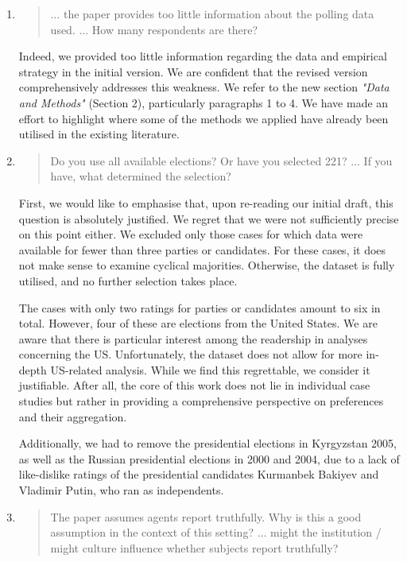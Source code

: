 \documentclass[a4paper, 12pt]{scrartcl}
\begin{document}
\begin{enumerate}[label=(\alph*)] 
	\item
\begin{quote}
$\ldots$ the paper provides too little information about the polling data used. $\ldots$ How many respondents are there?
\end{quote}	
Indeed, we provided too little information regarding the data and empirical strategy in the initial version. We are confident that the revised version comprehensively addresses this weakness. We refer to the new section \textit{"Data and Methods"} (Section 2), particularly paragraphs 1 to 4. We have made an effort to highlight where some of the methods we applied have already been utilised in the existing literature.
\item 
\begin{quote}
	Do you use all available elections? Or have you selected 221? $\ldots$ If you have, what determined the selection?
\end{quote}
First, we would like to emphasise that, upon re-reading our initial draft, this question is absolutely justified. We regret that we were not sufficiently precise on this point either. We excluded only those cases for which data were available for fewer than three parties or candidates. For these cases, it does not make sense to examine cyclical majorities. Otherwise, the dataset is fully utilised, and no further selection takes place. 

The cases with only two ratings for parties or candidates amount to six in total. However, four of these are elections from the United States. We are aware that there is particular interest among the readership in analyses concerning the US. Unfortunately, the dataset does not allow for more in-depth US-related analysis. While we find this regrettable, we consider it justifiable. After all, the core of this work does not lie in individual case studies but rather in providing a comprehensive perspective on preferences and their aggregation.

Additionally, we had to remove the presidential elections in Kyrgyzstan 2005, as well as the Russian presidential elections in 2000 and 2004, due to a lack of like-dislike ratings of the presidential candidates Kurmanbek Bakiyev and Vladimir Putin, who ran as independents.
\item \begin{quote}
	The paper assumes agents report truthfully. Why is this a good assumption in the context of this setting? $\ldots$ might the institution / might culture influence whether subjects report truthfully?
\end{quote}


\end{enumerate}
\end{document}
